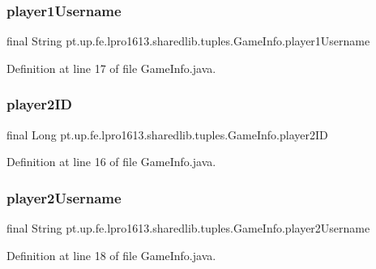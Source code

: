\subsubsection{\texorpdfstring{player1\+Username}{player1Username}}
{\footnotesize\ttfamily final String pt.\+up.\+fe.\+lpro1613.\+sharedlib.\+tuples.\+Game\+Info.\+player1\+Username}



Definition at line 17 of file Game\+Info.\+java.

\hypertarget{classpt_1_1up_1_1fe_1_1lpro1613_1_1sharedlib_1_1tuples_1_1_game_info_ae633a96ef35d188e7e29e49345b4fc03}{}\label{classpt_1_1up_1_1fe_1_1lpro1613_1_1sharedlib_1_1tuples_1_1_game_info_ae633a96ef35d188e7e29e49345b4fc03} 
\subsubsection{\texorpdfstring{player2\+ID}{player2ID}}
{\footnotesize\ttfamily final Long pt.\+up.\+fe.\+lpro1613.\+sharedlib.\+tuples.\+Game\+Info.\+player2\+ID}



Definition at line 16 of file Game\+Info.\+java.

\hypertarget{classpt_1_1up_1_1fe_1_1lpro1613_1_1sharedlib_1_1tuples_1_1_game_info_acc5ef9716a5e4a617ac6c1f933671ae7}{}\label{classpt_1_1up_1_1fe_1_1lpro1613_1_1sharedlib_1_1tuples_1_1_game_info_acc5ef9716a5e4a617ac6c1f933671ae7} 
\subsubsection{\texorpdfstring{player2\+Username}{player2Username}}
{\footnotesize\ttfamily final String pt.\+up.\+fe.\+lpro1613.\+sharedlib.\+tuples.\+Game\+Info.\+player2\+Username}



Definition at line 18 of file Game\+Info.\+java.

